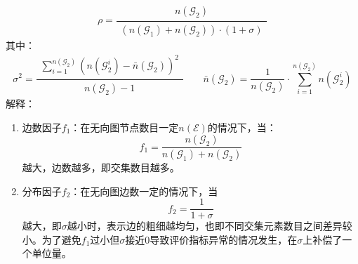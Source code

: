 \documentclass[12pt, onecolumn]{article}
\begin{document}
	\begin{equation*}
	\rho=\frac{
		\begin{aligned}
		n(\mathcal{G}_2)
		\end{aligned}
	}{
		\begin{aligned}
		\left( 	n(\mathcal{G}_1)+n(\mathcal{G}_2)\right) \cdot(1+\sigma)
		\end{aligned}
	}
	\end{equation*}
	其中：
	\begin{equation*}
	\sigma^2=	\frac{
		\begin{aligned}
		\sum_{i=1}^{n(\mathcal{G}_2)}
		\left( 
		n\left(\mathcal{G}_2^i \right) -\bar{n}{(\mathcal{G}_2) }
		\right) ^2
		\end{aligned}
	}{
		\begin{aligned}
		n(\mathcal{G}_2)-1
		\end{aligned}
	}
	\qquad
	\bar{n}{(\mathcal{G}_2)}=\frac{1}{n(\mathcal{G}_2)}\cdot\sum_{i=1}^{n(\mathcal{G}_2)}n(\mathcal{G}_2^i)
	\end{equation*}
	解释：
	\begin{enumerate}
		\item 边数因子$f_1$：在无向图节点数目一定$n(\mathcal{E})$的情况下，当：
		\begin{equation*}
		f_1=\frac{n(\mathcal{G}_2)}{n(\mathcal{G}_1)+n(\mathcal{G}_2)}
		\end{equation*}
		越大，边数越多，即交集数目越多。
		
		\item 分布因子$f_2$：在无向图边数一定的情况下，当
		\begin{equation*}
		f_2=\frac{1}{1+\sigma}
		\end{equation*}
		越大，即$\sigma$越小时，表示边的粗细越均匀，也即不同交集元素数目之间差异较小。为了避免$f_1$过小但$\sigma$接近0导致评价指标异常的情况发生，在$\sigma$上补偿了一个单位量。
	\end{enumerate}
	
\end{document}
